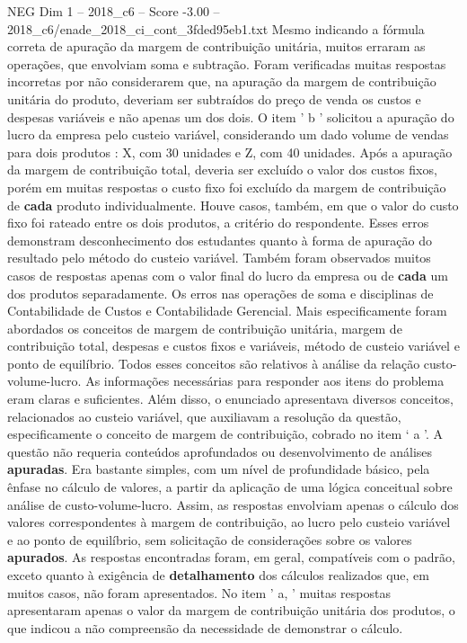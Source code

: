 \begin{textsample}{NEG Dim 1 – 2018\_c6 – Score -3.00 – 2018\_c6/enade\_2018\_ci\_cont\_3fded95eb1.txt}
Mesmo indicando a fórmula correta de apuração da margem de contribuição unitária, muitos erraram as operações, que envolviam soma e subtração.
Foram verificadas muitas respostas incorretas por não considerarem que, na apuração da margem de contribuição unitária do produto, deveriam ser subtraídos do preço de venda os custos e despesas variáveis e não apenas um dos dois.
O item ' b ' solicitou a apuração do lucro da empresa pelo custeio variável, considerando um dado volume de vendas para dois produtos : X, com 30 unidades e Z, com 40 unidades.
Após a apuração da margem de contribuição total, deveria ser excluído o valor dos custos fixos, porém em muitas respostas o custo fixo foi excluído da margem de contribuição de \textbf{cada} produto individualmente.
Houve casos, também, em que o valor do custo fixo foi rateado entre os dois produtos, a critério do respondente.
Esses erros demonstram desconhecimento dos estudantes quanto à forma de apuração do resultado pelo método do custeio variável.
Também foram observados muitos casos de respostas apenas com o valor final do lucro da empresa ou de \textbf{cada} um dos produtos separadamente.
Os erros nas operações de soma e disciplinas de Contabilidade de Custos e Contabilidade Gerencial.
Mais especificamente foram abordados os conceitos de margem de contribuição unitária, margem de contribuição total, despesas e custos fixos e variáveis, método de custeio variável e ponto de equilíbrio.
Todos esses conceitos são relativos à análise da relação custo-volume-lucro.
As informações necessárias para responder aos itens do problema eram claras e suficientes.
Além disso, o enunciado apresentava diversos conceitos, relacionados ao custeio variável, que auxiliavam a resolução da questão, especificamente o conceito de margem de contribuição, cobrado no item ‘ a ’.
A questão não requeria conteúdos aprofundados ou desenvolvimento de análises \textbf{apuradas}.
Era bastante simples, com um nível de profundidade básico, pela ênfase no cálculo de valores, a partir da aplicação de uma lógica conceitual sobre análise de custo-volume-lucro.
Assim, as respostas envolviam apenas o cálculo dos valores correspondentes à margem de contribuição, ao lucro pelo custeio variável e ao ponto de equilíbrio, sem solicitação de considerações sobre os valores \textbf{apurados}.
As respostas encontradas foram, em geral, compatíveis com o padrão, exceto quanto à exigência de \textbf{detalhamento} dos cálculos realizados que, em muitos casos, não foram apresentados.
No item ' a, ' muitas respostas apresentaram apenas o valor da margem de contribuição unitária dos produtos, o que indicou a não compreensão da necessidade de demonstrar o cálculo.

\end{textsample}
